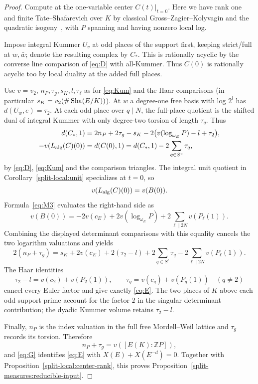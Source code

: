 \begin{proof}

Compute at the one-variable center \(C(t)|_{t=0}\). Here we have rank one and finite Tate--Shafarevich over \(K\) by classical Gross--Zagier--Kolyvagin and the quadratic isogeny~\cite{GZ86,Kolyvagin90}, with \(P\) spanning and having nonzero local log.

Impose integral Kummer \(U_v\) at odd places of the support first, keeping strict/full at \(w,\bar w\); denote the resulting complex by \(C_*\). This is rationally acyclic by the converse line comparison of \eqref{eq:D} with all-Kummer. Thus \(C(0)\) is rationally acyclic too by local duality at the added full places.

Use \(v=v_2\), \(n_P,\tau_g,s_K,l,\tau_\ell\) as for \eqref{eq:Kum} and the Haar comparisons (in particular \(s_K=v_2(\#\operatorname{Sha}(E/K))\)). At \(w\) a degree-one free basis with log \(2^l\) has \(d(U_w,e)=\tau_2\). At each odd place over \(q\mid N\), the full-place quotient is the shifted dual of integral Kummer with only degree-two torsion of length \(\tau_q\). Thus
\[
 \begin{split}
 d(C_*,1)
   &=2n_P+2\tau_g-s_K-2\big(v(\log_{\omega_E}P)-l+\tau_2\big),\\
 -v(L_{\rm alg}(C)(0))&=d(C(0),1)=d(C_*,1)-2\sum_{q\in S^\circ}\tau_q,
 \end{split}
\]
by \eqref{eq:D}, \eqref{eq:Kum} and the comparison triangles. The integral unit quotient in Corollary~\ref{split-local:unit} specializes at \(t=0\), so
\[
 v(L_{\rm alg}(C)(0))=v(B(0)).
\]
Formula~\eqref{eq:M3} evaluates the right-hand side as
\[
 v(B(0))=-2v(c_E)+2v(\log_{\omega_E}P)
                  +2\sum_{\ell\mid2N}v(P_\ell(1)).
\]
Combining the displayed determinant comparisons with this equality cancels the two logarithm valuations and yields
\[
 2(n_P+\tau_g)
 =s_K+2v(c_E)+2(\tau_2-l)
       +2\sum_{q\in S^\circ}\tau_q
       -2\sum_{\ell\mid2N}v(P_\ell(1)).
\]
The Haar identities
\[
 \tau_2-l=v(c_2)+v(P_2(1)),\qquad
 \tau_q=v(c_q)+v(P_q(1))\quad(q\ne2)
\]
cancel every Euler factor and give exactly \eqref{eq:E}. The two places of \(K\) above each odd support prime account for the factor \(2\) in the singular determinant contribution; the dyadic Kummer volume retains \(\tau_2-l\).

Finally, \(n_P\) is the index valuation in the full free Mordell--Weil lattice and \(\tau_g\) records its torsion. Therefore
\[
 n_P+\tau_g=v([E(K):\mathbb ZP]),
\]
and \eqref{eq:G} identifies \eqref{eq:E} with \(X(E)+X(E^{-d})=0\). Together with Proposition~\ref{split-local:center-rank}, this proves Proposition~\ref{split-measures:reducible-input}.
\end{proof}


